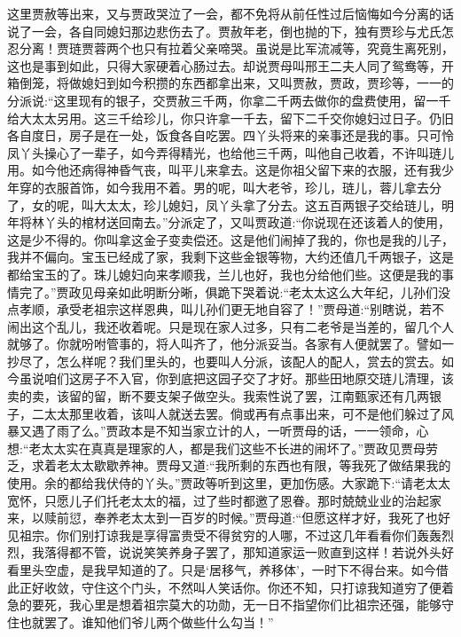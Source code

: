 \begin{parag}
    这里贾赦等出来，又与贾政哭泣了一会，都不免将从前任性过后恼悔如今分离的话说了一会，各自同媳妇那边悲伤去了。贾赦年老，倒也抛的下，独有贾珍与尤氏怎忍分离！贾琏贾蓉两个也只有拉着父亲啼哭。虽说是比军流减等，究竟生离死别，这也是事到如此，只得大家硬着心肠过去。却说贾母叫邢王二夫人同了鸳鸯等，开箱倒笼，将做媳妇到如今积攒的东西都拿出来，又叫贾赦，贾政，贾珍等，一一的分派说:“这里现有的银子，交贾赦三千两，你拿二千两去做你的盘费使用，留一千给大太太另用。这三千给珍儿，你只许拿一千去，留下二千交你媳妇过日子。仍旧各自度日，房子是在一处，饭食各自吃罢。四丫头将来的亲事还是我的事。只可怜凤丫头操心了一辈子，如今弄得精光，也给他三千两，叫他自己收着，不许叫琏儿用。如今他还病得神昏气丧，叫平儿来拿去。这是你祖父留下来的衣服，还有我少年穿的衣服首饰，如今我用不着。男的呢，叫大老爷，珍儿，琏儿，蓉儿拿去分了，女的呢，叫大太太，珍儿媳妇，凤丫头拿了分去。这五百两银子交给琏儿，明年将林丫头的棺材送回南去。”分派定了，又叫贾政道:“你说现在还该着人的使用，这是少不得的。你叫拿这金子变卖偿还。这是他们闹掉了我的，你也是我的儿子，我并不偏向。宝玉已经成了家，我剩下这些金银等物，大约还值几千两银子，这是都给宝玉的了。珠儿媳妇向来孝顺我，兰儿也好，我也分给他们些。这便是我的事情完了。”贾政见母亲如此明断分晰，俱跪下哭着说:“老太太这么大年纪，儿孙们没点孝顺，承受老祖宗这样恩典，叫儿孙们更无地自容了！”贾母道:“别瞎说，若不闹出这个乱儿，我还收着呢。只是现在家人过多，只有二老爷是当差的，留几个人就够了。你就吩咐管事的，将人叫齐了，他分派妥当。各家有人便就罢了。譬如一抄尽了，怎么样呢？我们里头的，也要叫人分派，该配人的配人，赏去的赏去。如今虽说咱们这房子不入官，你到底把这园子交了才好。那些田地原交琏儿清理，该卖的卖，该留的留，断不要支架子做空头。我索性说了罢，江南甄家还有几两银子，二太太那里收着，该叫人就送去罢。倘或再有点事出来，可不是他们躲过了风暴又遇了雨了么。”贾政本是不知当家立计的人，一听贾母的话，一一领命，心想:“老太太实在真真是理家的人，都是我们这些不长进的闹坏了。”贾政见贾母劳乏，求着老太太歇歇养神。贾母又道:“我所剩的东西也有限，等我死了做结果我的使用。余的都给我伏侍的丫头。”贾政等听到这里，更加伤感。大家跪下:“请老太太宽怀，只愿儿子们托老太太的福，过了些时都邀了恩眷。那时兢兢业业的治起家来，以赎前愆，奉养老太太到一百岁的时候。”贾母道:“但愿这样才好，我死了也好见祖宗。你们别打谅我是享得富贵受不得贫穷的人哪，不过这几年看看你们轰轰烈烈，我落得都不管，说说笑笑养身子罢了，那知道家运一败直到这样！若说外头好看里头空虚，是我早知道的了。只是‘居移气，养移体’，一时下不得台来。如今借此正好收敛，守住这个门头，不然叫人笑话你。你还不知，只打谅我知道穷了便着急的要死，我心里是想着祖宗莫大的功勋，无一日不指望你们比祖宗还强，能够守住也就罢了。谁知他们爷儿两个做些什么勾当！”
\end{parag}


